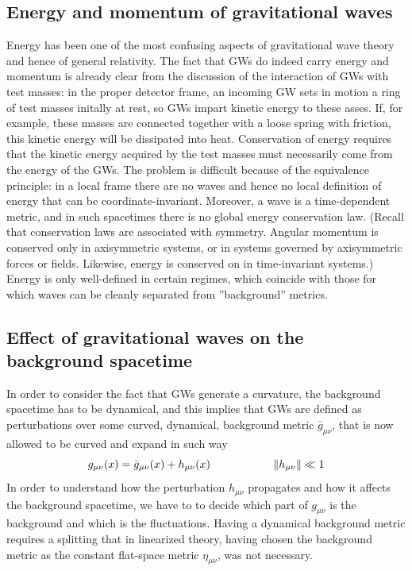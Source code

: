 \documentclass[binding=0.6cm, LaM]{sapthesis}
\begin{document}
\subsection{Energy and momentum of gravitational waves}

 Energy has been one of the most confusing aspects of gravitational wave theory and hence of general relativity.
The fact that GWs do indeed carry energy and momentum is already clear from the discussion of the interaction of GWs with test masses: 
in the proper detector frame, an incoming GW sets in motion a ring of test masses initally at rest, so GWs impart kinetic energy to these asses. 
If, for example, these masses are connected together with a loose spring with friction, this kinetic energy will be dissipated into heat. 
Conservation of energy requires that the kinetic energy acquired by the test masses must necessarily come from the energy of the GWs. 
The problem is difficult because of the equivalence principle: in a local frame there are no waves and hence no local definition of energy that can be coordinate-invariant. 
Moreover, a wave is a time-dependent metric, and in such spacetimes there is no global energy conservation law. (Recall that conservation laws are associated with symmetry. 
Angular momentum is conserved only in axisymmetric systems, or in systems governed by axisymmetric forces or fields. 
Likewise, energy is conserved on in time-invariant systems.) Energy is only well-defined in certain regimes, which coincide with those for which waves can be cleanly separated from ”background”
 metrics.

\subsection{Effect of gravitational waves on the background spacetime}
In order to consider the fact that GWs generate a curvature, the background spacetime has to be dynamical, and this implies that GWs are defined as perturbations over some curved, dynamical, background metric $\bar g_{\mu \nu}$, that is now allowed to be curved and expand in such way
\begin{equation}
g_{\mu \nu}(x) = \bar g_{\mu \nu}(x) + h_{\mu \nu}(x) \hspace*{2cm}\|h_{\mu\nu}\|\ll 1
\end{equation}
In order to understand how the perturbation $h_{\mu \nu}$ propagates and how it affects the background spacetime, we have to to decide which part of $g_{\mu\nu}$ is the background and which is the fluctuations. Having a dynamical background metric requires a splitting that in linearized theory, having chosen the background metric as the constant flat-space metric $\eta_{\mu\nu}$, was not necessary.
\end{document}
